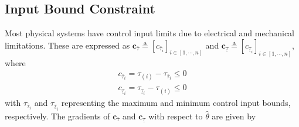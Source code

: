 \documentclass[lettersize,journal]{IEEEtran}
\begin{document}
\subsection{Input Bound Constraint}

Most physical systems have control input limits due to electrical and mechanical limitations. These are expressed as $\mathbf{c}_{\overline \tau}\triangleq [c_{\overline \tau_i}]_{i\in[1,\cdots,n]}$ and $\mathbf{c}_{\underline\tau}\triangleq [c_{\underline\tau_i}]_{i\in[1,\cdots,n]}$, where
\begin{equation}
    \begin{aligned}
        c_{\overline \tau_i}=\tau_{(i)} - {\tau_{\overline \tau_i}} \le 0
        \\
        c_{\underline\tau_i}={\tau_{\underline\tau_i}}-\tau_{(i)} \le 0
    \end{aligned}
    \label{eq. cstr input saturation}
\end{equation}
with $\tau_{\overline \tau_i}$ and $\tau_{\underline\tau_i}$ representing the maximum and minimum control input bounds, respectively.
The gradients of $\mathbf{c}_{\overline \tau}$ and $\mathbf{c}_{\underline\tau}$ with respect to $\hat\theta$ are given by
\end{document}
